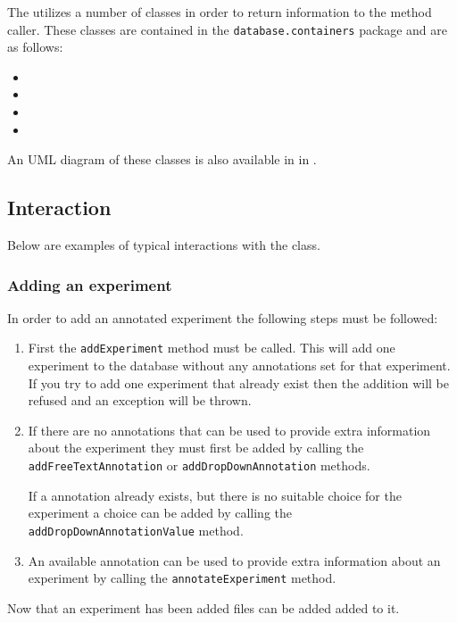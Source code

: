 The  utilizes a number of classes in order to return information to the method caller. These classes are contained in the \texttt{database.containers} package and are as follows:
\begin{itemize}
\item {}
\item {}
\item {}
\item {}
\end{itemize}

An UML diagram of these classes is also available in  in .

\subsection{Interaction}
Below are examples of typical interactions with the  class.

\subsubsection{Adding an experiment}
In order to add an annotated experiment the following steps must be followed:
\begin{enumerate}
\item First the \texttt{addExperiment} method must be called. This will add one experiment to the database without any annotations set for that experiment. If you try to add one experiment that already exist then the addition will be refused and an exception will be thrown.

\item If there are no annotations that can be used to provide extra information about the experiment they must first be added by calling the \texttt{addFreeTextAnnotation} or \texttt{addDropDownAnnotation} methods.

\subitem If a  annotation already exists, but there is no suitable choice for the experiment a choice can be added by calling the \texttt{addDropDownAnnotationValue} method.

\item An available annotation can be used to provide extra information about an experiment by calling the \texttt{annotateExperiment} method.
\end{enumerate}

Now that an experiment has been added files can be added added to it.

